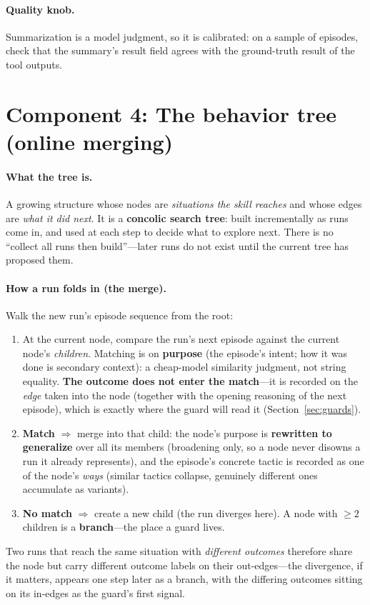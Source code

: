\documentclass[11pt]{article}
\begin{document}
\paragraph{Quality knob.} Summarization is a model judgment, so it is calibrated:
on a sample of episodes, check that the summary's result field agrees with the
ground-truth result of the tool outputs.

\section{Component 4: The behavior tree (online merging)}
\label{sec:tree}

\paragraph{What the tree is.} A growing structure whose nodes are
\emph{situations the skill reaches} and whose edges are \emph{what it did next}.
It is a \textbf{concolic search tree}: built incrementally as runs come in, and
used at each step to decide what to explore next. There is no ``collect all runs
then build''---later runs do not exist until the current tree has proposed them.

\paragraph{How a run folds in (the merge).} Walk the new run's episode sequence
from the root:
\begin{enumerate}[leftmargin=1.5em, itemsep=1pt]
  \item At the current node, compare the run's next episode against the current
  node's \emph{children}. Matching is on \textbf{purpose} (the episode's intent;
  how it was done is secondary context): a cheap-model similarity judgment, not
  string equality. \textbf{The outcome does not enter the match}---it is recorded
  on the \emph{edge} taken into the node (together with the opening reasoning of
  the next episode), which is exactly where the guard will read it
  (Section~\ref{sec:guards}).
  \item \textbf{Match} $\Rightarrow$ merge into that child: the node's purpose is
  \textbf{rewritten to generalize} over all its members (broadening only, so a
  node never disowns a run it already represents), and the episode's concrete
  tactic is recorded as one of the node's \emph{ways} (similar tactics collapse,
  genuinely different ones accumulate as variants).
  \item \textbf{No match} $\Rightarrow$ create a new child (the run diverges
  here). A node with $\ge 2$ children is a \textbf{branch}---the place a guard
  lives.
\end{enumerate}
Two runs that reach the same situation with \emph{different outcomes} therefore
share the node but carry different outcome labels on their out-edges---the
divergence, if it matters, appears one step later as a branch, with the differing
outcomes sitting on its in-edges as the guard's first signal.
\end{document}
